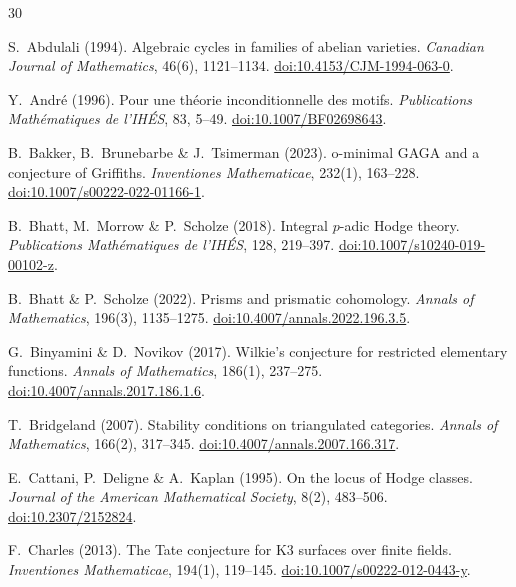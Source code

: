 \documentclass[aps,prd,twocolumn,superscriptaddress,nofootinbib]{revtex4-2}
\theoremstyle{definition}
\theoremstyle{remark}
\begin{document}
\begin{thebibliography}{30}
\frenchspacing\sloppy
\setlength{\emergencystretch}{3em}

S.~Abdulali (1994).
Algebraic cycles in families of abelian varieties.
\textit{Canadian Journal of Mathematics}, 46(6), 1121--1134.
\href{https://doi.org/10.4153/CJM-1994-063-0}{doi:10.4153/CJM-1994-063-0}.

Y.~André (1996).
Pour une théorie inconditionnelle des motifs.
\textit{Publications Mathématiques de l'IHÉS}, 83, 5--49.
\href{https://doi.org/10.1007/BF02698643}{doi:10.1007/BF02698643}.

B.~Bakker, B.~Brunebarbe \& J.~Tsimerman (2023).
o-minimal GAGA and a conjecture of Griffiths.
\textit{Inventiones Mathematicae}, 232(1), 163--228.
\href{https://doi.org/10.1007/s00222-022-01166-1}{doi:10.1007/s00222-022-01166-1}.

B.~Bhatt, M.~Morrow \& P.~Scholze (2018).
Integral $p$-adic Hodge theory.
\textit{Publications Mathématiques de l'IHÉS}, 128, 219--397.
\href{https://doi.org/10.1007/s10240-019-00102-z}{doi:10.1007/s10240-019-00102-z}.

B.~Bhatt \& P.~Scholze (2022).
Prisms and prismatic cohomology.
\textit{Annals of Mathematics}, 196(3), 1135--1275.
\href{https://doi.org/10.4007/annals.2022.196.3.5}{doi:10.4007/annals.2022.196.3.5}.

G.~Binyamini \& D.~Novikov (2017).
Wilkie's conjecture for restricted elementary functions.
\textit{Annals of Mathematics}, 186(1), 237--275.
\href{https://doi.org/10.4007/annals.2017.186.1.6}{doi:10.4007/annals.2017.186.1.6}.

T.~Bridgeland (2007).
Stability conditions on triangulated categories.
\textit{Annals of Mathematics}, 166(2), 317--345.
\href{https://doi.org/10.4007/annals.2007.166.317}{doi:10.4007/annals.2007.166.317}.

E.~Cattani, P.~Deligne \& A.~Kaplan (1995).
On the locus of Hodge classes.
\textit{Journal of the American Mathematical Society}, 8(2), 483--506.
\href{https://doi.org/10.2307/2152824}{doi:10.2307/2152824}.

F.~Charles (2013).
The Tate conjecture for K3 surfaces over finite fields.
\textit{Inventiones Mathematicae}, 194(1), 119--145.
\href{https://doi.org/10.1007/s00222-012-0443-y}{doi:10.1007/s00222-012-0443-y}.


\end{thebibliography}
\end{document}
